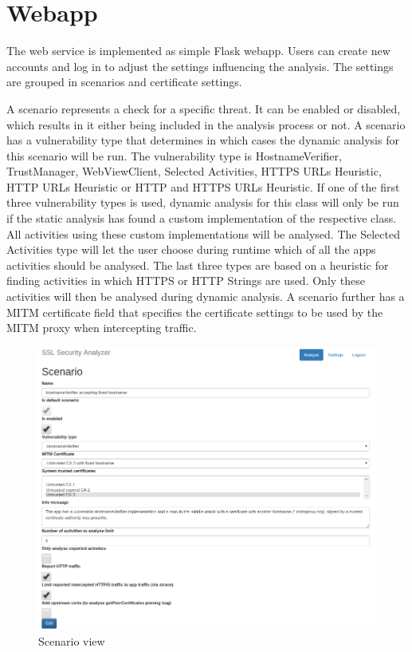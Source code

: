 \documentclass[draft,final]{vutinfth} %
\begin{document}
\section*{Webapp}

The web service is implemented as simple Flask webapp. Users can create new accounts and log in to adjust the settings influencing the analysis. The settings are grouped in scenarios and certificate settings.

A scenario represents a check for a specific threat. It can be enabled or disabled, which results in it either being included in the analysis process or not. A scenario has a vulnerability type that determines in which cases the dynamic analysis for this scenario will be run. The vulnerability type is HostnameVerifier, TrustManager, WebViewClient, Selected Activities, HTTPS URLs Heuristic, HTTP URLs Heuristic or HTTP and HTTPS URLs Heuristic. If one of the first three vulnerability types is used, dynamic analysis for this class will only be run if the static analysis has found a custom implementation of the respective class. All activities using these custom implementations will be analysed. The Selected Activities type will let the user choose during runtime which of all the apps activities should be analysed. The last three types are based on a heuristic for finding activities in which HTTPS or HTTP Strings are used. Only these activities will then be analysed during dynamic analysis. A scenario further has a MITM certificate field that specifies the certificate settings to be used by the MITM proxy when intercepting traffic.

\begin{figure}
\caption{Scenario view}
\label{fig:scenario}
\includegraphics[width=\textwidth,height=0.5\textheight]{scenario_new.png}
\end{figure}
\end{document}
